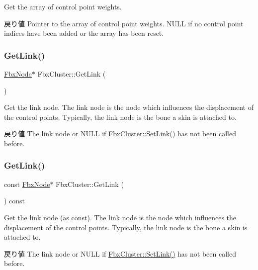 Get the array of control point weights. \begin{DoxyReturn}{戻り値}
Pointer to the array of control point weights. {\ttfamily N\+U\+LL} if no control point indices have been added or the array has been reset. 
\end{DoxyReturn}
\mbox{\label{class_fbx_cluster_a4fa45a143cf4e47f9869ae7ca561ac2a}} 
\subsubsection{\texorpdfstring{Get\+Link()}{GetLink()}\hspace{0.1cm}{\footnotesize\ttfamily [1/2]}}
{\footnotesize\ttfamily \hyperlink{class_fbx_node}{Fbx\+Node}$\ast$ Fbx\+Cluster\+::\+Get\+Link (\begin{DoxyParamCaption}{ }\end{DoxyParamCaption})}

Get the link node. The link node is the node which influences the displacement of the control points. Typically, the link node is the bone a skin is attached to. \begin{DoxyReturn}{戻り値}
The link node or {\ttfamily N\+U\+LL} if \hyperlink{class_fbx_cluster_ac47ba1185bc9bb341636dbaf43f209ff}{Fbx\+Cluster\+::\+Set\+Link()} has not been called before. 
\end{DoxyReturn}
\mbox{\label{class_fbx_cluster_a72cb9d141005de3f3236681686983893}} 
\subsubsection{\texorpdfstring{Get\+Link()}{GetLink()}\hspace{0.1cm}{\footnotesize\ttfamily [2/2]}}
{\footnotesize\ttfamily const \hyperlink{class_fbx_node}{Fbx\+Node}$\ast$ Fbx\+Cluster\+::\+Get\+Link (\begin{DoxyParamCaption}{ }\end{DoxyParamCaption}) const}

Get the link node (as const). The link node is the node which influences the displacement of the control points. Typically, the link node is the bone a skin is attached to. \begin{DoxyReturn}{戻り値}
The link node or {\ttfamily N\+U\+LL} if \hyperlink{class_fbx_cluster_ac47ba1185bc9bb341636dbaf43f209ff}{Fbx\+Cluster\+::\+Set\+Link()} has not been called before. 
\end{DoxyReturn}
\mbox{\label{class_fbx_cluster_a518c2eab52051a783b2b0137dde14ff7}} 
